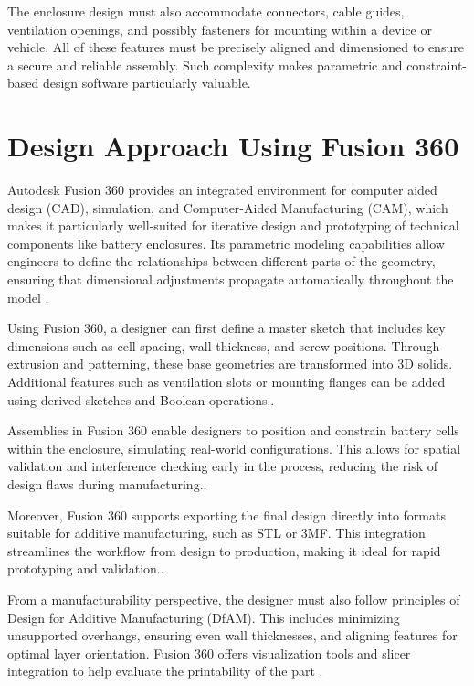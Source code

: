 The enclosure design must also accommodate connectors, cable guides, ventilation openings, and possibly fasteners for mounting within a device or vehicle. All of these features must be precisely aligned and dimensioned to ensure a secure and reliable assembly. Such complexity makes parametric and constraint-based design software particularly valuable.

\section{Design Approach Using Fusion 360}
Autodesk Fusion 360 provides an integrated environment for computer aided design (CAD), simulation, and Computer-Aided Manufacturing (CAM), which makes it particularly well-suited for iterative design and prototyping of technical components like battery enclosures. Its parametric modeling capabilities allow engineers to define the relationships between different parts of the geometry, ensuring that dimensional adjustments propagate automatically throughout the model \cite{hogan2025}.

Using Fusion 360, a designer can first define a master sketch that includes key dimensions such as cell spacing, wall thickness, and screw positions. Through extrusion and patterning, these base geometries are transformed into 3D solids. Additional features such as ventilation slots or mounting flanges can be added using derived sketches and Boolean operations\cite{hogan2025}..

Assemblies in Fusion 360 enable designers to position and constrain battery cells within the enclosure, simulating real-world configurations. This allows for spatial validation and interference checking early in the process, reducing the risk of design flaws during manufacturing\cite{hogan2025}..

Moreover, Fusion 360 supports exporting the final design directly into formats suitable for additive manufacturing, such as STL or 3MF. This integration streamlines the workflow from design to production, making it ideal for rapid prototyping and validation\cite{hogan2025}..

From a manufacturability perspective, the designer must also follow principles of Design for Additive Manufacturing (DfAM). This includes minimizing unsupported overhangs, ensuring even wall thicknesses, and aligning features for optimal layer orientation. Fusion 360 offers visualization tools and slicer integration to help evaluate the printability of the part \cite{anderson2020}.

